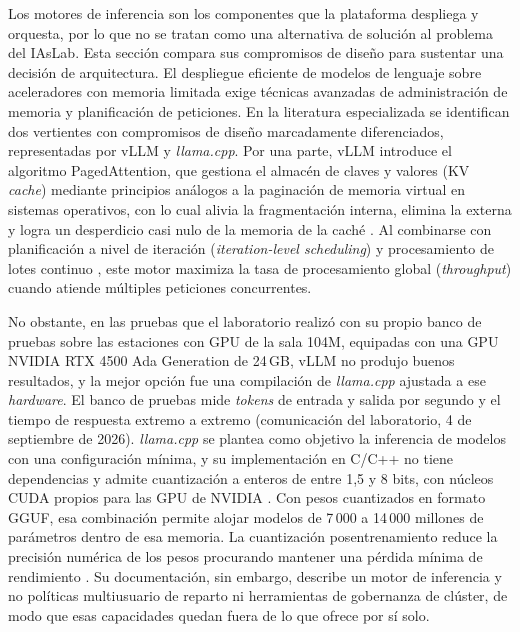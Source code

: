 Los motores de inferencia son los componentes que la plataforma despliega y orquesta, por lo que no se tratan como una alternativa de solución al problema del IAsLab. Esta sección compara sus compromisos de diseño para sustentar una decisión de arquitectura. El despliegue eficiente de modelos de lenguaje sobre aceleradores con memoria limitada exige técnicas avanzadas de administración de memoria y planificación de peticiones. En la literatura especializada se identifican dos vertientes con compromisos de diseño marcadamente diferenciados, representadas por vLLM y \emph{llama.cpp}. Por una parte, vLLM introduce el algoritmo PagedAttention, que gestiona el almacén de claves y valores (KV \emph{cache}) mediante principios análogos a la paginación de memoria virtual en sistemas operativos, con lo cual alivia la fragmentación interna, elimina la externa y logra un desperdicio casi nulo de la memoria de la caché \citep{kwon-pagedattention-2023}. Al combinarse con planificación a nivel de iteración (\emph{iteration-level scheduling}) y procesamiento de lotes continuo \citep{yu-orca-2022, miao-llmservingsurvey-2025}, este motor maximiza la tasa de procesamiento global (\emph{throughput}) cuando atiende múltiples peticiones concurrentes.

No obstante, en las pruebas que el laboratorio realizó con su propio banco de pruebas sobre las estaciones con GPU de la sala 104M, equipadas con una GPU NVIDIA RTX 4500 Ada Generation de 24\,GB, vLLM no produjo buenos resultados, y la mejor opción fue una compilación de \emph{llama.cpp} ajustada a ese \emph{hardware}. El banco de pruebas mide \emph{tokens} de entrada y salida por segundo y el tiempo de respuesta extremo a extremo (comunicación del laboratorio, 4 de septiembre de 2026). \emph{llama.cpp} se plantea como objetivo la inferencia de modelos con una configuración mínima, y su implementación en C/C++ no tiene dependencias y admite cuantización a enteros de entre 1,5 y 8 bits, con núcleos CUDA propios para las GPU de NVIDIA \citep{llamacpp-readme-2026}. Con pesos cuantizados en formato GGUF, esa combinación permite alojar modelos de 7\,000 a 14\,000 millones de parámetros dentro de esa memoria. La cuantización posentrenamiento reduce la precisión numérica de los pesos procurando mantener una pérdida mínima de rendimiento \citep{frantar-gptq-2023, chen-llmquantizationsurvey-2026}. Su documentación, sin embargo, describe un motor de inferencia y no políticas multiusuario de reparto ni herramientas de gobernanza de clúster, de modo que esas capacidades quedan fuera de lo que ofrece por sí solo.

